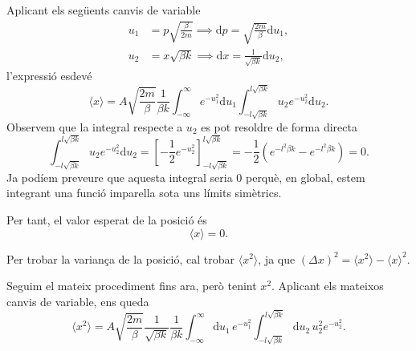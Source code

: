 \documentclass[a4paper, 10pt]{article}
\begin{document}
\begin{enumerate}
	Aplicant els següents canvis de variable
	\begin{align}
		u_1 &= p\sqrt{\frac{\beta}{2m}} \implies \mathrm{d}p = \sqrt{\frac{2m}{\beta}} \mathrm{d}u_1, \\
		u_2 &= x\sqrt{\beta k} \implies \mathrm{d}x = \frac{1}{\sqrt{\beta k}} \mathrm{d}u_2,
	\end{align}
	l'expressió esdevé
	\begin{equation}
		\langle x \rangle = A \sqrt{\frac{2m}{\beta}} \frac{1}{\beta k} \int_{-\infty}^{\infty} e^{-u_1^2} \mathrm{d}u_1 \int_{-l\sqrt{\beta k}}^{l\sqrt{\beta k}} u_2 e^{-u_2^2} \mathrm{d}u_2.
	\end{equation}
	Observem que la integral respecte a $u_2$ es pot resoldre de forma directa
	\begin{equation}
		\int_{-l\sqrt{\beta k}}^{l\sqrt{\beta k}} u_2 e^{-u_2^2} \mathrm{d}u_2 = \left[ -\frac{1}{2} e^{-u_2^2} \right]_{-l\sqrt{\beta k}}^{l\sqrt{\beta k}} = -\frac{1}{2} \left( e^{-l^2 \beta k} - e^{-l^2\beta k} \right) = 0.
	\end{equation}
	Ja podíem preveure que aquesta integral seria 0 perquè, en global, estem integrant una funció imparella sota uns límits simètrics. 
	
	Per tant, el valor esperat de la posició és
	\begin{equation}
		\boxed{\langle x \rangle = 0}.
	\end{equation}
	

	Per trobar la variança de la posició, cal trobar $ \langle x^2 \rangle $, ja que $(\Delta x)^2 = \langle x^2 \rangle - \langle x \rangle ^2 $. 
	
	Seguim el mateix procediment fins ara, però tenint $x^2$. Aplicant els mateixos canvis de variable, ens queda
	\begin{equation}
		\langle x^2 \rangle = A \sqrt{\frac{2m}{\beta}}\frac{1}{\sqrt{\beta k}}\frac{1}{\beta k}\int_{-\infty}^{\infty} \mathrm{d}u_1 \, e^{-u_1^2} \int_{-l\sqrt{\beta k}}^{l\sqrt{\beta k}} \mathrm{d}u_2 \, u_2^2 e^{-u_2^2}.
	\end{equation} 
	

\end{enumerate}
\end{document}
